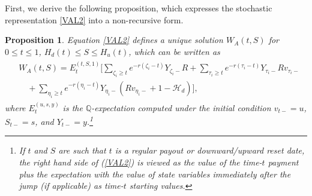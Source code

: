 \documentclass[draft, noinfoline]{ectaart}
\numberwithin{equation}{section}
\theoremstyle{plain}
\newtheorem{proposition}{Proposition}
\begin{document}
\begin{appendices}
First, we derive the following proposition, which expresses the stochastic representation \eqref{VAL2} into a non-recursive form.
\begin{proposition}\label{prop:nonrecur}
	Equation \eqref{VAL2} defines a unique solution $W_A(t,S)$ for $0\le t\le 1$, $H_d(t)\le S\le H_u(t)$, which can be written as
	\begin{align}\label{VALnonrecur}
	\begin{split}
	&W_A(t,S)=E_t^{(t,S,1)}\Bigg[\sum_{\zeta_i\ge t}e^{-r(\zeta_i-t)}Y_{\zeta_i-}R+\sum_{\tau_i\ge t}e^{-r(\tau_i-t)}Y_{\tau_i-}Rv_{\tau_i-}\\
	&\quad+\sum_{\eta_i\ge t}e^{-r(\eta_i-t)}Y_{\eta_i-}(Rv_{\eta_i-}+1-\mathcal{H}_d)\Bigg],
	\end{split}
	\end{align}
	where $E^{(u,s,y)}_t$ is the $\mathbb{Q}$-expectation computed under the initial condition $v_{t-}=u$, $S_{t-}=s$, and $Y_{t-}=y$.\footnote{If $t$ and $S$ are such that $t$ is a regular payout or downward/upward reset date, the right hand side of (\ref{VAL2}) is viewed as the value of the time-$t$ payment plus the expectation with the value of state variables immediately after the jump (if applicable) as time-$t$ starting values.}
\end{proposition}


\end{appendices}
\end{document}
